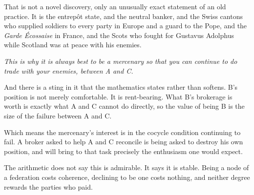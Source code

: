 \documentclass[11pt,a4paper]{article}
\begin{document}
That is not a novel discovery, only an unusually exact statement of an old
practice. It is the entrep\^ot state, and the neutral banker, and the Swiss
cantons who supplied soldiers to every party in Europe and a guard to the Pope,
and the \emph{Garde \'Ecossaise} in France, and the Scots who fought for
Gustavus Adolphus while Scotland was at peace with his enemies.

\begin{sectionbox}
\emph{This is why it is always best to be a mercenary so that you can continue
to do trade with your enemies, between A and C.}
\end{sectionbox}

And there is a sting in it that the mathematics states rather than softens.
B's position is not merely comfortable. It is rent-bearing. What B's brokerage
is worth is exactly what A and C cannot do directly, so the value of being B is
the size of the failure between A and C.

Which means the mercenary's interest is in the cocycle condition continuing to
fail. A broker asked to help A and C reconcile is being asked to destroy his own
position, and will bring to that task precisely the enthusiasm one would expect.

The arithmetic does not say this is admirable. It says it is stable. Being a
node of a federation costs coherence, declining to be one costs nothing, and
neither degree rewards the parties who paid.
\end{document}
